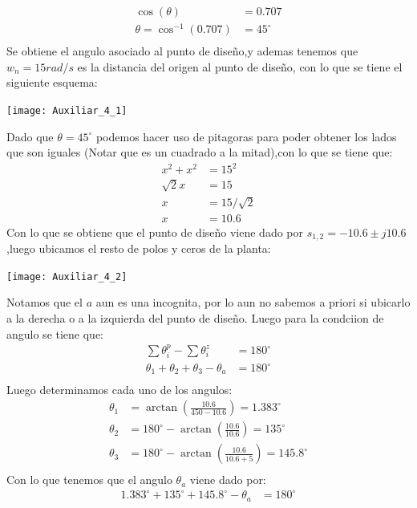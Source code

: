 \documentclass[
  11pt,
  letterpaper,
   addpoints,
   answers
  ]{exam}
\begin{document}
\begin{questions}
\begin{solution}
\begin{align}
    \cos(\theta) &= 0.707 \\
    \theta = \cos^{-1}(0.707) &= 45^{\circ} \\
\end{align}
Se obtiene el angulo asociado al punto de diseño,y ademas tenemos que $w_{n}=15 rad/s$ es la distancia del origen al punto de diseño, con lo que se tiene el siguiente esquema:
\begin{center}
    \texttt{[image: Auxiliar\_4\_1]}
\end{center}
Dado que $\theta=45^{\circ}$ podemos hacer uso de pitagoras para poder obtener los lados que son iguales (Notar que es un cuadrado a la mitad),con lo que se tiene que:
\begin{align}
    x^{2} + x^{2} &= 15^{2}\\
    \sqrt{2}x &= 15\\
    x &= 15/\sqrt{2}\\
    x &= 10.6
\end{align}
Con lo que se obtiene que el punto de diseño viene dado por $s_{1,2}=-10.6 \pm j10.6$,luego ubicamos el resto de polos y ceros de la planta:
\begin{center}
    \texttt{[image: Auxiliar\_4\_2]}
\end{center}
Notamos que el $a$ aun es una incognita, por lo aun no sabemos a priori si ubicarlo a la derecha o a la izquierda del punto de diseño. Luego para la condciion de angulo se tiene que:
\begin{align}
    \sum \theta_{i}^{p} - \sum \theta_{i}^{z} &= 180^{\circ}\\
    \theta_{1} + \theta_{2} + \theta_{3} - \theta_{a} &= 180^{\circ}\\
\end{align}
Luego determinamos cada uno de los angulos:
\begin{align}
    \theta_{1} &= \arctan(\frac{10.6}{450-10.6}) = 1.383^{\circ}\\
    \theta_{2} &= 180^{\circ} - \arctan(\frac{10.6}{10.6}) = 135^{\circ}\\
    \theta_{3} &= 180^{\circ} - \arctan(\frac{10.6}{10.6+5})=145.8^{\circ}\\
\end{align}
Con lo que tenemos que el angulo $\theta_{a}$ viene dado por:
\begin{align}
    1.383^{\circ} + 135^{\circ} + 145.8^{\circ} - \theta_{a} &= 180^{\circ}\\

\end{align}
\end{solution}
\end{questions}
\end{document}
